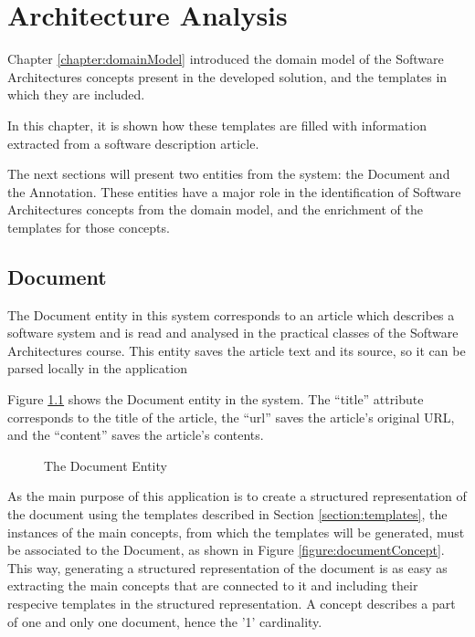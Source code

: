 
\chapter{Architecture Analysis}
\label{chapter:architecture}
Chapter \ref{chapter:domainModel} introduced the domain model of the Software Architectures concepts present in the developed solution, and the templates in which they are included.

In this chapter, it is shown how these templates are filled with information extracted from a software description article.

The next sections will present two entities from the system: the Document and the Annotation. These entities have a major role in the identification of Software Architectures concepts from the domain model, and the enrichment of the templates for those concepts.

\section{Document}
\label{section:document}

The Document entity in this system corresponds to an article which describes a software system and is read and analysed in the practical classes of the Software Architectures course. This entity saves the article text and its source, so it can be parsed locally in the application

Figure \ref{figure:documentEntity} shows the Document entity in the system. The ``title'' attribute corresponds to the title of the article, the ``url'' saves the article's original URL, and the ``content'' saves the article's contents.

\begin{figure}[h]
\centering
\renewcommand {\umltextcolor}{black}
\renewcommand {\umlfillcolor}{none}
\renewcommand {\umldrawcolor}{black}

\caption{The Document Entity}
\label{figure:documentEntity}
\end{figure}

As the main purpose of this application is to create a structured representation of the document using the templates described in Section \ref{section:templates}, the instances of the main concepts, from which the templates will be generated, must be associated to the Document, as shown in Figure \ref{figure:documentConcept}. This way, generating a structured representation of the document is as easy as extracting the main concepts that are connected to it and including their respecive templates in the structured representation. A concept describes a part of one and only one document, hence the '1' cardinality.  

